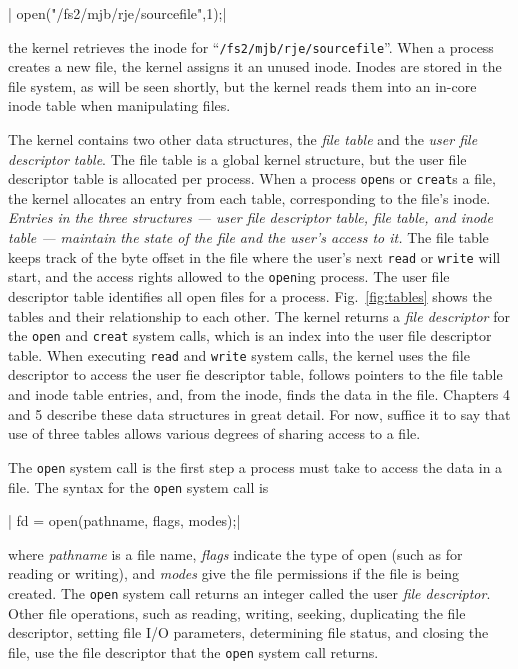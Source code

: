 |  open("/fs2/mjb/rje/sourcefile",1);|

the kernel retrieves the inode for ``\verb|/fs2/mjb/rje/sourcefile|''. When a process
creates a new file, the kernel assigns it an unused inode. Inodes are stored in the file
system, as will be seen shortly, but the kernel reads them into an in-core inode table
when manipulating files.

The kernel contains two other data structures, the \emph{file table} and the \emph{user
  file descriptor table}. The file table is a global kernel structure, but the user file
descriptor table is allocated per process. When a process \texttt{open}s or
\texttt{creat}s a file, the kernel allocates an entry from each table, corresponding to
the file's inode. \emph{Entries in the three structures --- user file descriptor table,
  file table, and inode table --- maintain the state of the file and the user's access to
  it.} The file table keeps track of the byte offset in the file where the user's next
\texttt{read} or \texttt{write} will start, and the access rights allowed to the
\texttt{open}ing process. The user file descriptor table identifies all open files for a
process.  Fig.~\ref{fig:tables} shows the tables and their relationship to each other. The
kernel returns a \emph{file descriptor} for the \texttt{open} and \texttt{creat} system
calls, which is an index into the user file descriptor table. When executing \texttt{read}
and \texttt{write} system calls, the kernel uses the file descriptor to access the user
fie descriptor table, follows pointers to the file table and inode table entries, and,
from the inode, finds the data in the file. Chapters 4 and 5 describe these data
structures in great detail. For now, suffice it to say that use of three tables allows
various degrees of sharing access to a file.

The \texttt{open} system call is the first step a process must take to access the data in
a file. The syntax for the \texttt{open} system call is

|  fd = open(pathname, flags, modes);|

where \emph{pathname} is a file name, \emph{flags} indicate the type of open (such as for
reading or writing), and \emph{modes} give the file permissions if the file is being
created. The \texttt{open} system call returns an integer called the user \emph{file
  descriptor}. Other file operations, such as reading, writing, seeking, duplicating the
file descriptor, setting file I/O parameters, determining file status, and closing the
file, use the file descriptor that the \texttt{open} system call returns.

